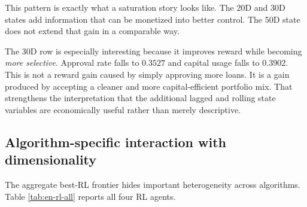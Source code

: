 \documentclass[12pt,a4paper]{article}
\begin{document}
This pattern is exactly what a saturation story looks like. The 20D and 30D states add information that can be monetized into better control. The 50D state does not extend that gain in a comparable way.

The 30D row is especially interesting because it improves reward while becoming \emph{more selective}. Approval rate falls to $0.3527$ and capital usage falls to $0.3902$. This is not a reward gain caused by simply approving more loans. It is a gain produced by accepting a cleaner and more capital-efficient portfolio mix. That strengthens the interpretation that the additional lagged and rolling state variables are economically useful rather than merely descriptive.

\subsection{Algorithm-specific interaction with dimensionality}

The aggregate best-RL frontier hides important heterogeneity across algorithms. Table \ref{tab:en-rl-all} reports all four RL agents.
\end{document}
